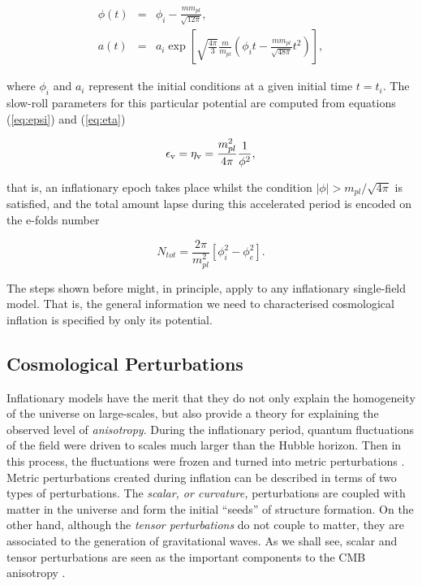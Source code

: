 \documentclass{rmaa}
\def\beq{\begin{equation}}
\def\eeq{\end{equation}}
\def\bea{\begin{eqnarray}}
\def\eea{\end{eqnarray}}
\begin{document}
\bea
\phi(t)&=&\phi_i - \frac{m m_{pl}}{\sqrt{12 \pi}},\\
a(t)&=& a_i \exp\left[\sqrt{\frac{4\pi}{3}}\frac{m}{m_{pl}}\left( \phi_i t - \frac{m m_{pl}}{\sqrt{48 \pi}}t^2 \right) \right], \nonumber
\eea

\noindent
where $\phi_i$ and $a_i$ represent the initial conditions at a given initial time $t=t_i$.
The slow-roll parameters for this particular potential are computed from 
equations (\ref{eq:epsi}) and (\ref{eq:eta})

\beq
\epsilon_{\rm v}=\eta_{\rm v}= \frac{m_{pl}^2}{4\pi} \frac{1}{\phi^2}, 
\eeq

\noindent
that is, an inflationary epoch takes place whilst the condition $|\phi|> {m_{pl}}/\sqrt{4\pi}$ 
is satisfied, and the total amount lapse during this accelerated period is encoded on the e-folds number

\beq
N_{tot}= \frac{2\pi}{m_{pl}^2}\left[\phi^2_i - \phi^2_e \right].
\eeq 

The steps shown before might, in principle, apply to any inflationary single-field model. 
That is, the general information we need to characterised 
cosmological inflation is specified by  only its potential. 

 
\subsection{Cosmological Perturbations}

Inflationary models have the merit that they do not only explain the 
 homogeneity of the universe on large-scales,
but also provide a theory  for explaining the observed level of {\em
anisotropy}. During the inflationary period, quantum fluctuations of the field 
were driven to scales much larger than the Hubble horizon. Then in this process, the fluctuations
were frozen and turned into metric perturbations \citep{Mukhanov}. 
%
Metric perturbations created during inflation can be described in terms of two types of perturbations.
The {\it scalar, or curvature,} perturbations are coupled with matter in the
universe and form the initial ``seeds'' of structure formation. On the other hand, although the 
{\it tensor perturbations} do not couple to matter, they are associated
to the generation of gravitational waves.
As we shall see, scalar and tensor perturbations are seen as the important components to 
 the CMB anisotropy \citep{Hu}. 
\\
\end{document}
